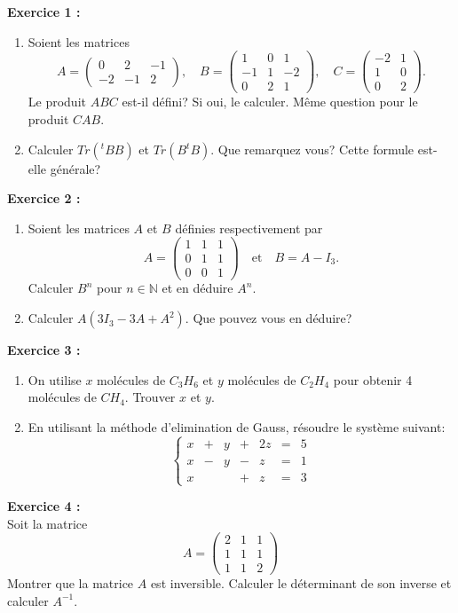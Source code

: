\documentclass[11pt]{article}
\begin{document}
 \noindent \textbf{Exercice 1 :}\\
 \begin{enumerate}
 \item Soient les matrices $$A = \begin{pmatrix} 0 & 2 & -1  \\ -2 & -1 & 2 \end{pmatrix}, \quad B = \begin{pmatrix} 1 & 0 & 1  \\ -1 &  1 & -2 \\ 
0 & 2 & 1 \end{pmatrix}, \quad C = \begin{pmatrix} -2 & 1  \\ 1 & 0\\ 
 0 & 2\end{pmatrix} .$$ Le produit $ABC$ est-il défini? Si oui, le calculer. Même question pour le produit $CAB$.
\item  Calculer $ Tr({}^t\!B B)$ et $Tr(B {}^t\!B)$. Que remarquez vous? Cette formule est-elle générale?\\ 

\end{enumerate}
\noindent \textbf{Exercice 2 :}\\
\begin{enumerate}
\item Soient les matrices $A$ et $B$ définies respectivement par
\begin{equation*}
A = 
\begin{pmatrix}
1&1&1\\
0&1&1\\
0&0&1
\end{pmatrix}
\quad \mbox{et} \quad B = A - I_3.
\end{equation*}
Calculer $B^n$ pour $n \in \mathbb{N}$ et en déduire $A^n$.
\item Calculer $A(3I_3 - 3A + A^2)$. Que pouvez vous en déduire?\\
\end{enumerate}
\textbf{Exercice 3 :}\\ 
\begin{enumerate}
\item On utilise $x$ molécules de $C_3H_6$ et $y$ molécules de $C_2H_4$ pour obtenir 4 molécules de $CH_4$. Trouver $x$ et $y$.\\
\item En utilisant la méthode d'elimination de Gauss, résoudre le système suivant:
$$\left\{\begin{array}{cccccccc}x&+&y&+&2z&=&5\\x&-&y&-&z&=&1\\x&&&+&z&=&3\end{array}\right.$$
\end{enumerate}
\noindent \textbf{Exercice 4 :}\\
Soit la matrice 
\begin{equation*}
A=
\begin{pmatrix}
2 &1& 1\\
1 &1 &1\\
1 &1& 2
\end{pmatrix}
\end{equation*}
 Montrer que la matrice $A$ est inversible. Calculer le déterminant de son inverse et calculer $A^{-1}$. 
\end{document}
